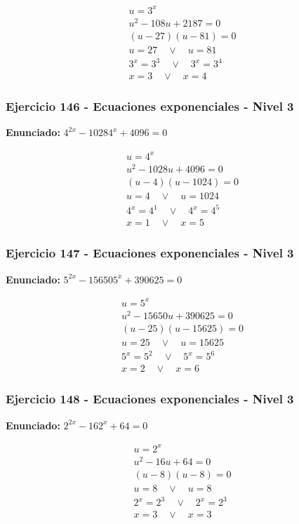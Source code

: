 \documentclass[12pt,a4paper]{article}
\begin{document}
\[
\begin{aligned}
u=3^x\\
u^2-108u+2187=0\\
(u-27)(u-81)=0\\
u=27\quad \vee\quad u=81\\
3^x=3^{3}\quad \vee\quad 3^x=3^{4}\\
\boxed{x=3\quad \vee\quad x=4}
\end{aligned}
\]


\subsubsection*{Ejercicio 146 - Ecuaciones exponenciales - Nivel 3}
\textbf{Enunciado:} \(4^{2x}-10284^x+4096=0\)

\[
\begin{aligned}
u=4^x\\
u^2-1028u+4096=0\\
(u-4)(u-1024)=0\\
u=4\quad \vee\quad u=1024\\
4^x=4^{1}\quad \vee\quad 4^x=4^{5}\\
\boxed{x=1\quad \vee\quad x=5}
\end{aligned}
\]


\subsubsection*{Ejercicio 147 - Ecuaciones exponenciales - Nivel 3}
\textbf{Enunciado:} \(5^{2x}-156505^x+390625=0\)

\[
\begin{aligned}
u=5^x\\
u^2-15650u+390625=0\\
(u-25)(u-15625)=0\\
u=25\quad \vee\quad u=15625\\
5^x=5^{2}\quad \vee\quad 5^x=5^{6}\\
\boxed{x=2\quad \vee\quad x=6}
\end{aligned}
\]


\subsubsection*{Ejercicio 148 - Ecuaciones exponenciales - Nivel 3}
\textbf{Enunciado:} \(2^{2x}-162^x+64=0\)

\[
\begin{aligned}
u=2^x\\
u^2-16u+64=0\\
(u-8)(u-8)=0\\
u=8\quad \vee\quad u=8\\
2^x=2^{3}\quad \vee\quad 2^x=2^{3}\\
\boxed{x=3\quad \vee\quad x=3}
\end{aligned}
\]
\end{document}
